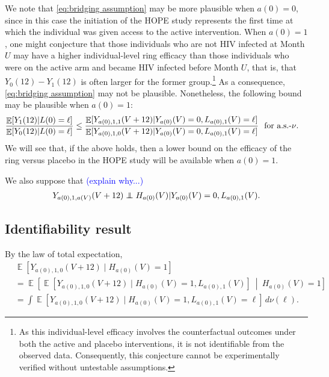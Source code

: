 \documentclass[12pt]{article}
\theoremstyle{definition}
\newcommand\independent{\protect\mathpalette{\protect\independenT}{\perp}}
\def\independenT#1#2{\mathrel{\rlap{$#1#2$}\mkern2mu{#1#2}}}
\DeclareMathOperator{\cE}{\mathbb{E}}
\newcommand{\Hopen}{V}
\begin{document}
We note that \eqref{eq:bridging assumption} may be more plausible when $a(0)=0$, since in this case the initiation of the HOPE study represents the first time at which the individual was given access to the active intervention. When $a(0)=1$, one might conjecture that those individuals who are not HIV infected at Month $U$ may have a higher individual-level ring efficacy than those individuals who were on the active arm and became HIV infected before Month $U$, that is, that $Y_0(12)-Y_1(12)$ is often larger for the former group.\footnote{As this individual-level efficacy involves the counterfactual outcomes under both the active and placebo interventions, it is not identifiable from the observed data. Consequently, this conjecture cannot be experimentally verified without untestable assumptions.} As a consequence, \eqref{eq:bridging assumption} may not be plausible. Nonetheless, the following bound may be plausible when $a(0)=1$:
\begin{align}
    \frac{\cE[Y_{1}(12)|L(0)=\ell]}{\cE[Y_{0}(12)|L(0)=\ell]}&\le \frac{\cE[Y_{a(0),1,1}(\Hopen+12)|Y_{a(0)}(\Hopen)=0,L_{a(0),1}(\Hopen)=\ell]}{\cE[Y_{a(0),1,0}(\Hopen+12)|Y_{a(0)}(\Hopen)=0,L_{a(0),1}(\Hopen)=\ell]}\ \textnormal{ for a.s.-$\nu$}. \label{eq:bridging assumption bound}
\end{align}
We will see that, if the above holds, then a lower bound on the efficacy of the ring versus placebo in the HOPE study will be available when $a(0)=1$.

We also suppose that \textcolor{blue}{(explain why...)}
\begin{align}
    Y_{a(0),1, a(V)}(\Hopen+12)\independent H_{a(0)}(\Hopen) | Y_{a(0)}(\Hopen)=0,L_{a(0),1}(\Hopen). \label{eq:Hindep}
\end{align}

\subsection{Identifiability result}
By the law of total expectation, %
\begin{align}
    &\cE[Y_{a(0),1,0}(\Hopen+12)\mid H_{a(0)}(\Hopen)=1] \nonumber \\
    &= \cE\left[\cE[Y_{a(0),1,0}(\Hopen+12)\mid H_{a(0)}(\Hopen)=1,L_{a(0),1}(\Hopen)]\ \middle|\  H_{a(0)}(\Hopen)=1\right] \nonumber \\
    &= \int \cE[Y_{a(0),1,0}(\Hopen+12)\mid H_{a(0)}(\Hopen)=1,L_{a(0),1}(\Hopen)=\ell]\, d\nu(\ell). %
    \label{eq:psia0} 
\end{align}
\end{document}
